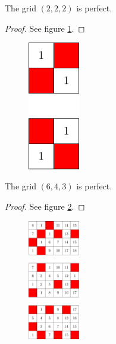 \begin{con}
\label{con:2x2x2}
The grid $(2,2,2)$ is perfect.
\end{con}

\begin{proof}
See figure \ref{fig:2x2x2_numbered_heatmap}.
\end{proof}

\begin{figure}[]
\centering
\includegraphics[width=0.2\textwidth]{figures/A/2x2x2_numbered_heatmap.pdf}
\caption{}
\label{fig:2x2x2_numbered_heatmap}
\end{figure}

\begin{con}
\label{con:6x4x3}
The grid $(6,4,3)$ is perfect.
\end{con}

\begin{proof}
See figure \ref{fig:4x6x3_numbered_heatmap}.
\end{proof}

\begin{figure}[]
\centering
\includegraphics[width=0.2\textwidth]{figures/A/4x6x3_numbered_heatmap.pdf}
\caption{}
\label{fig:4x6x3_numbered_heatmap}
\end{figure}

